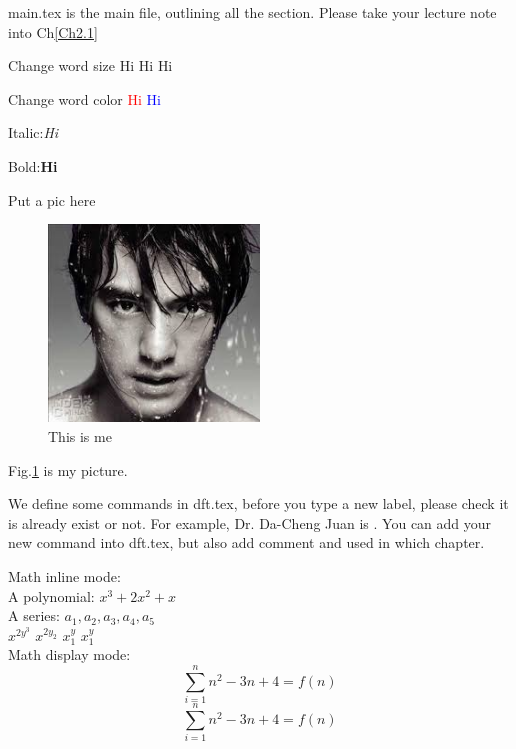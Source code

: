 main.tex is the main file, outlining all the section. Please take your lecture note into Ch\ref{Ch2.1} 

Change word size \tiny{Hi} \Huge{Hi} \Large{Hi}

Change word color \textcolor{red}{Hi} \textcolor{blue}{Hi}

Italic:\textit{Hi} 

Bold:\textbf{Hi} 

Put a pic here
\begin{figure}[htb]
\centering
\includegraphics[width=0.5\textwidth]{FIG/mypic.jpg}
\caption{This is me} 
\label{mypic}
\end{figure}

Fig.\ref{mypic} is my picture.

We define some commands in dft.tex, before you type a new label, please check it is already exist or not. For example, Dr. Da-Cheng Juan is \DC. You can add your new command into dft.tex, but also add comment and used in which chapter. 

Math inline mode:\\
A polynomial: $x^{3} + 2x^{2} + x$\\
A series: $a_{1}, a_{2}, a_{3}, a_{4}, a_{5}$\\
$x^{2y^{3}}$ $x^{2y_{2}}$ $x^{y}_{1}$ $x_{1}^{y}$\\

Math display mode:\\
\[
\sum_{i=1}^{n}{n^2-3n+4} = f(n)
\]
\begin{equation}
\label{myequation}
\sum_{i=1}^{n}{n^2-3n+4} = f(n)
\end{equation}

